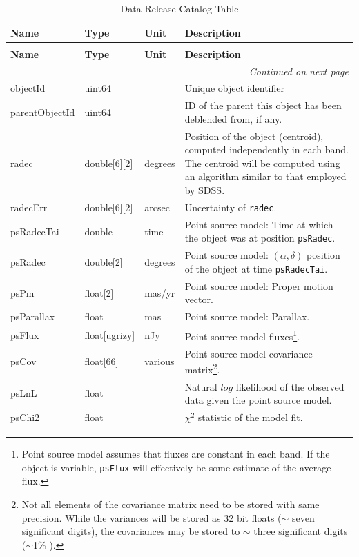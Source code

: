 \documentclass[SE,lsstdraft,toc]{lsstdoc}
\newenvironment{schema}[3]{%
\setlength\LTleft{0pt}
\setlength\LTright{\fill}
\begin{longtable}{p{0.2\textwidth}p{0.14\textwidth}p{0.14\textwidth}p{0.41\textwidth}}

\caption[#1]{#2\label{#3}}\\

\hline \textbf{Name} & \textbf{Type} & \textbf{Unit} & \textbf{Description}\\ \hline
\endfirsthead

\caption[#1]{#2}\\

\hline \textbf{Name} & \textbf{Type} & \textbf{Unit} & \textbf{Description}\\ \hline
\endhead

\hline \multicolumn{4}{r}{\emph{Continued on next page}} \\
\endfoot

\hline\hline
\endlastfoot
}{%
\hline
\end{longtable}
}
\begin{document}
\begin{schema}{\Object Table}{Data Release Catalog \Object Table}{tbl:objectTable}


objectId & uint64 & ~ & Unique object identifier \\

parentObjectId & uint64 & ~ & ID of the parent \Object this object has been deblended from, if any. \\

radec & double[6][2] & degrees & Position of the object (centroid), computed independently in each band.
The centroid will be computed using an algorithm similar to that employed by SDSS.\\

radecErr & double[6][2] & arcsec & Uncertainty of \texttt{radec}. \\

psRadecTai & double & time & Point source model: Time at which the object was at position \texttt{psRadec}. \\

psRadec & double[2] & degrees & Point source model: $(\alpha, \delta)$ position of the object at time \texttt{psRadecTai}. \\

psPm & float[2] & mas/yr & Point source model: Proper motion vector.\\

psParallax & float & mas & Point source model: Parallax. \\

psFlux & float[ugrizy] & nJy & Point source model fluxes\footnote{Point source model assumes that fluxes are constant in each band. If the object is variable, \texttt{psFlux} will effectively be some estimate of the average flux.}.\\

psCov & float[66] & various & Point-source model covariance matrix\footnote{Not all elements of the covariance matrix need to be stored with same precision. While the variances will be stored as 32 bit floats ($\sim$ seven significant digits), the covariances may be stored to $\sim$ three significant digits ($\sim$1\% ).}. \\

psLnL & float & ~ & Natural $log$ likelihood of the observed data given the point source model. \\

psChi2 & float & ~ & $\chi^2$ statistic of the model fit. \\


\end{schema}
\end{document}
